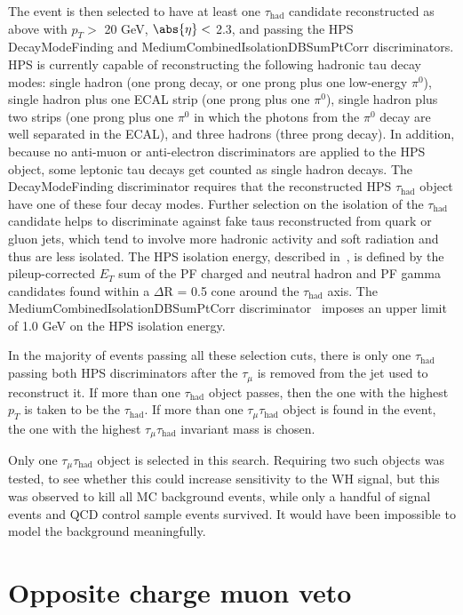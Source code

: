 The event is then selected to have at least one $\tau_{\text{had}}$ candidate reconstructed as above with $p_T >$ 20 GeV, $\abs{\eta} <$ 2.3, and passing the HPS DecayModeFinding and MediumCombinedIsolationDBSumPtCorr discriminators. HPS is currently capable of reconstructing the following hadronic tau decay modes: single hadron (one prong decay, or one prong plus one low-energy $\pi^0$), single hadron plus one ECAL strip (one prong plus one $\pi^0$), single hadron plus two strips (one prong plus one $\pi^0$ in which the photons from the $\pi^0$ decay are well separated in the ECAL), and three hadrons (three prong decay). In addition, because no anti-muon or anti-electron discriminators are applied to the HPS object, some leptonic tau decays get counted as single hadron decays.  The DecayModeFinding discriminator requires that the reconstructed HPS $\tau_{\text{had}}$ object have one of these four decay modes. Further selection on the isolation of the $\tau_{\text{had}}$ candidate helps to discriminate against fake taus reconstructed from quark or gluon jets, which tend to involve more hadronic activity and soft radiation and thus are less isolated.  The HPS isolation energy, described in~\cite{CMS_AN_2010-082}, is defined by the pileup-corrected $E_T$ sum of the PF charged and neutral hadron and PF gamma candidates found within a $\Delta$R = 0.5 cone around the $\tau_{\text{had}}$ axis.  The MediumCombinedIsolationDBSumPtCorr discriminator~\cite{CMS:tauidtwiki} imposes an upper limit of 1.0 GeV on the HPS isolation energy.

In the majority of events passing all these selection cuts, there is only one $\tau_{\text{had}}$ passing both HPS discriminators after the $\tau_{\mu}$ is removed from the jet used to reconstruct it. If more than one $\tau_{\text{had}}$ object passes, then the one with the highest $p_T$ is taken to be the $\tau_{\text{had}}$. If more than one $\tau_{\mu}\tau_{\text{had}}$ object is found in the event, the one with the highest $\tau_{\mu}\tau_{\text{had}}$ invariant mass is chosen.

Only one $\tau_{\mu}\tau_{\text{had}}$ object is selected in this search. Requiring two such objects was tested, to see whether this could increase sensitivity to the WH signal, but this was observed to kill all MC background events, while only a handful of signal events and QCD control sample events survived.  It would have been impossible to model the background meaningfully.

\section{Opposite charge muon veto\label{sec:evtsel-OSSF}}

